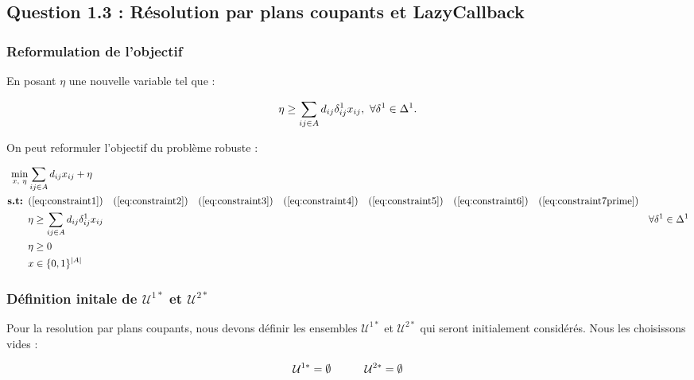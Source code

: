 \documentclass{article}
\begin{document}
\subsection{Question 1.3 : Résolution par plans coupants et LazyCallback}

\subsubsection{Reformulation de l'objectif}

En posant $\eta$ une nouvelle variable tel que :

\begin{align}
  \eta \geq \sum_{ij \in A} d_{ij} \delta_{ij}^{1} x_{ij}, \ \forall \delta^{1} \in \Delta^{1}. \notag
\end{align}

On peut reformuler l'objectif du problème robuste : 

\begin{align}
  \min_{x, \hspace{1px} \hspace{1px} \hspace{1px} \eta} & \sum_{ij \in A} d_{ij} x_{ij} + \eta && \notag \\
  \textbf{s.t: }  & (\ref{eq:constraint1}) \quad (\ref{eq:constraint2}) \quad (\ref{eq:constraint3}) \quad (\ref{eq:constraint4}) \quad (\ref{eq:constraint5}) \quad (\ref{eq:constraint6}) \quad (\ref{eq:constraint7prime}) \notag \\
  & \eta \geq \sum_{ij \in A} d_{ij} \delta_{ij}^{1} x_{ij} & \forall \delta^{1} \in \Delta^{1} \label{eq:constraint12} \\
  & \eta \geq 0 \notag \\
  & x \in \{0,1\}^{|A|} \notag
\end{align}

\subsubsection{Définition initale de $\mathcal{U}^{1*}$ et $\mathcal{U}^{2*}$}

Pour la resolution par plans coupants, nous devons définir les ensembles $\mathcal{U}^{1*}$ et $\mathcal{U}^{2*}$ qui seront initialement considérés.
Nous les choisissons vides : 

\begin{align}
  \mathcal{U}^{1*} = \emptyset \quad \quad \quad \mathcal{U}^{2*} = \emptyset \notag
\end{align}
\end{document}
